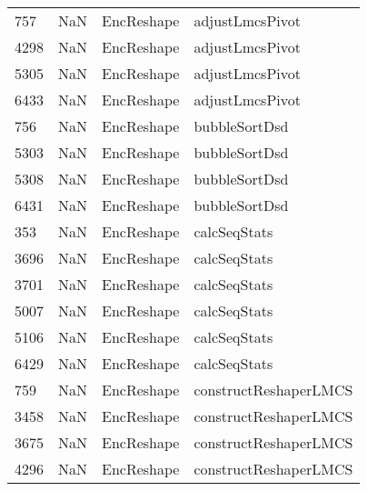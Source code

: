 \begin{tabular}{llll}
757  &                   NaN &                 EncReshape &                           adjustLmcsPivot \\
4298 &                   NaN &                 EncReshape &                           adjustLmcsPivot \\
5305 &                   NaN &                 EncReshape &                           adjustLmcsPivot \\
6433 &                   NaN &                 EncReshape &                           adjustLmcsPivot \\
756  &                   NaN &                 EncReshape &                             bubbleSortDsd \\
5303 &                   NaN &                 EncReshape &                             bubbleSortDsd \\
5308 &                   NaN &                 EncReshape &                             bubbleSortDsd \\
6431 &                   NaN &                 EncReshape &                             bubbleSortDsd \\
353  &                   NaN &                 EncReshape &                              calcSeqStats \\
3696 &                   NaN &                 EncReshape &                              calcSeqStats \\
3701 &                   NaN &                 EncReshape &                              calcSeqStats \\
5007 &                   NaN &                 EncReshape &                              calcSeqStats \\
5106 &                   NaN &                 EncReshape &                              calcSeqStats \\
6429 &                   NaN &                 EncReshape &                              calcSeqStats \\
759  &                   NaN &                 EncReshape &                     constructReshaperLMCS \\
3458 &                   NaN &                 EncReshape &                     constructReshaperLMCS \\
3675 &                   NaN &                 EncReshape &                     constructReshaperLMCS \\
4296 &                   NaN &                 EncReshape &                     constructReshaperLMCS \\

\end{tabular}
